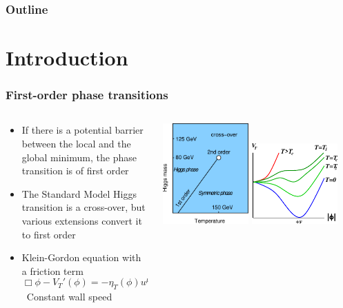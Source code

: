 \begin{frame}
    \titlepage
\end{frame}

\begin{frame}
    \frametitle{Outline}
    \tableofcontents
\end{frame}

\section{Introduction}

\begin{frame}
    \frametitle{First-order phase transitions}
    \begin{columns}
    \begin{column}{0.5\textwidth}
        \begin{itemize}
            \item If there is a potential barrier between the local and the global minimum, the phase transition is of first order
            \item The Standard Model Higgs transition is a cross-over, but various extensions convert it to first order
            \item Klein-Gordon equation with a friction term
            \begin{equation}
                \Box \phi - V_T'(\phi) = - \eta_T(\phi) u^\mu \partial_\mu \phi
            \end{equation}
            \textrightarrow \ Constant wall speed
        \end{itemize}
    \end{column}
    \begin{column}{0.5\textwidth}
        \includegraphics[width=0.45\textwidth]{../fig/smPhaseDiag2}%
        \hfill%
        \includegraphics[width=0.45\textwidth]{../fig/ThermalHiggsPotential}

\end{column}
\end{columns}
\end{frame}
